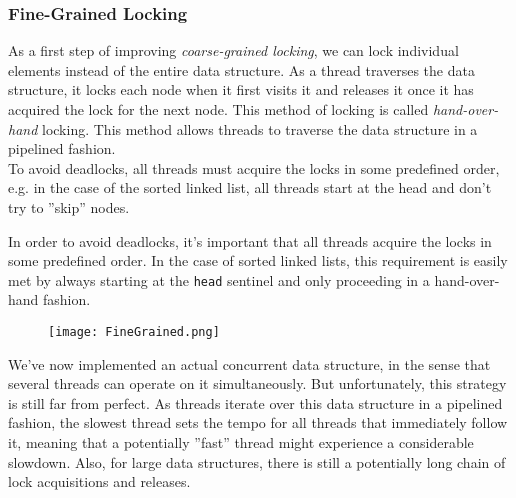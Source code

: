 \documentclass[main]{subfiles}
\begin{document}

\subsubsection{Fine-Grained Locking} \label{fine-grained locking}
As a first step of improving \textit{coarse-grained locking}, we can lock individual elements instead of the entire data structure. As a thread traverses the data structure, it locks each node when it first visits it and releases it once it has acquired the lock for the next node. This method of locking is called \textit{hand-over-hand} locking. This method allows threads to traverse the data structure in a pipelined fashion.\\[3mm]
To avoid deadlocks, all threads must acquire the locks in some predefined order, e.g. in the case of the sorted linked list, all threads start at the head and don't try to ''skip'' nodes. 
\begin{example}
    In order to avoid deadlocks, it's important that all threads acquire the locks in some predefined order. In the case of sorted linked lists, this requirement is easily met by always starting at the \texttt{head} sentinel and only proceeding in a hand-over-hand fashion.
    \begin{figure}[H]
        \centering
        \texttt{[image: FineGrained.png]}
    \end{figure}
\end{example}
We've now implemented an actual concurrent data structure, in the sense that several threads can operate on it simultaneously. But unfortunately, this strategy is still far from perfect. As threads iterate over this data structure in a pipelined fashion, the slowest thread sets the tempo for all threads that immediately follow it, meaning that a potentially ''fast'' thread might experience a considerable slowdown. Also, for large data structures, there is still a potentially long chain of lock acquisitions and releases.

\end{document}
